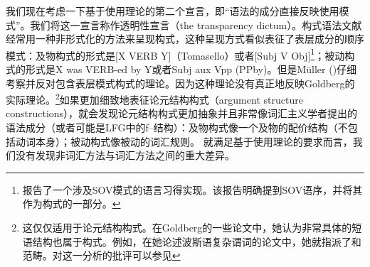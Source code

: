     我们现在考虑一下基于使用理论的第二个宣言，即“语法的成分直接反映使用模式”。我们将这一宣言称作透明性宣言（the transparency dictum）。构式语法文献经常用一种非形式化的方法来呈现构式，这种呈现方式看似表征了表层成分的顺序模式：及物构式的形式是[X VERB Y]（Tomasello）或者[Subj V Obj]\citep{Goldberg95a,Goldberg2006a}\footnote{%
   \citet[]{GCS2004a}报告了一个涉及SOV模式的语言习得实现。该报告明确提到SOV语序，并将其作为构式的一部分。
}；被动构式的形式是X was VERB-ed by Y\citep[]{Tomasello2003a}或者Subj aux Vpp (PPby)\citep[]{Goldberg2006a}。但是Müller (\citeyear[\S~2]{Mueller2006d})仔细考察并反对包含表层模式构式的理论。因为这种理论没有真正地反映Goldberg的实际理论。\footnote{%
这仅仅适用于论元结构构式。在Goldberg的一些论文中，她认为非常具体的短语结构也属于构式。例如，在她论述波斯语复杂谓词的论文\citep{Goldberg2003a}中，她就指派了\vnullc 和\vbarc 范畴。对这一分析的批评可以参见 
}如果更加细致地表征论元结构构式（argument structure constructions），就会发现论元结构构式更加抽象并且非常像词汇主义学者提出的语法成分（或者可能是LFG中的f--结构）：及物构式像一个及物的配价结构（不包括动词本身）；被动构式像被动的词汇规则。
    就满足基于使用理论的要求而言，我们没有发现非词汇方法与词汇方法之间的重大差异。

